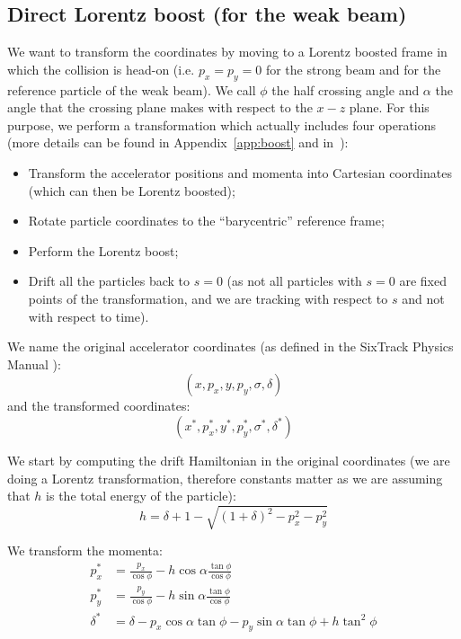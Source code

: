 \subsection{Direct Lorentz boost (for the weak beam)}
\label{sec:directboost}

We want to transform the coordinates by moving to a Lorentz boosted frame in which the collision is head-on (i.e. $p_x=p_y=0$ for the strong beam and for the reference particle of the weak beam). We call $\phi$ the half crossing angle and $\alpha$ the angle that the crossing plane makes with respect to the $x-z$ plane. For this purpose, we perform a transformation which actually includes four operations (more details can be found in Appendix~\ref{app:boost} and in~\cite{bb6dslides, beam_beam}):
\begin{itemize}
\item Transform the accelerator positions and momenta into Cartesian coordinates (which can then be Lorentz boosted);
\item Rotate particle coordinates to the ``barycentric'' reference frame;
\item Perform the Lorentz boost;
\item Drift all the particles back to $s=0$ (as not all particles with $s=0$ are fixed points of the transformation, and we are tracking with respect to $s$ and not with respect to time).
\end{itemize}

We name the original accelerator coordinates (as defined in the SixTrack Physics Manual \cite{sixtracksite}):
\begin{equation}
\left(x, p_x, y, p_y, \sigma, \delta\right)
\end{equation}
and the transformed coordinates:
\begin{equation}
\left(x^*, p_x^*, y^*, p_y^*, \sigma^*, \delta^*\right)
\end{equation}

We start by computing the drift Hamiltonian in the original coordinates (we are doing a Lorentz transformation, therefore constants matter as we are assuming that $h$ is the total energy of the particle):
\begin{equation}
h = \delta + 1 -\sqrt{\left(1+\delta\right)^2-p_x^2-p_y^2}
\end{equation}

We transform the momenta:
\begin{align}
p_x^* &= \frac{p_x}{\cos \phi} - h \cos \alpha \frac{\tan \phi}{\cos \phi} \label{eq:px}\\ 
p_y^* & = \frac{p_y}{\cos \phi} - h \sin \alpha \frac{\tan \phi}{\cos \phi}\\ 
\delta^* & = \delta -p_x \cos \alpha \tan \phi - p_y \sin \alpha \tan \phi +h \tan^2 \phi \label{eq:delta}
\end{align}

